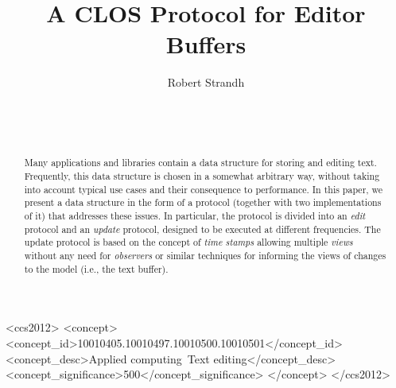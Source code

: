 \documentclass{sig-alternate-05-2015}
\def\inputtex#1{}
\begin{document}
\title{A CLOS Protocol for Editor Buffers}
\author{\alignauthor
Robert Strandh\\
\\
\\
\\
}


\maketitle

\begin{abstract}
Many applications and libraries contain a data structure for storing
and editing text.  Frequently, this data structure is chosen in a
somewhat arbitrary way, without taking into account typical use cases
and their consequence to performance.  In this paper, we present a
data structure in the form of a \clos{} protocol (together with two
implementations of it) that addresses these issues.  In particular,
the protocol is divided into an \emph{edit} protocol and an
\emph{update} protocol, designed to be executed at different
frequencies.  The update protocol is based on the concept of
\emph{time stamps} allowing multiple \emph{views} without any need for
\emph{observers} or similar techniques for informing the views of
changes to the model (i.e., the text buffer).
\end{abstract}

\begin{CCSXML}
  <ccs2012>
  <concept>
  <concept_id>10010405.10010497.10010500.10010501</concept_id>
  <concept_desc>Applied computing~Text editing</concept_desc>
  <concept_significance>500</concept_significance>
  </concept>
  </ccs2012>
\end{CCSXML}


\printccsdesc


\inputtex{spec-macros.tex}

\inputtex{sec-introduction.tex}
\inputtex{sec-previous.tex}
\inputtex{sec-our-method.tex}
\inputtex{sec-benefits.tex}
\inputtex{sec-conclusions.tex}
\inputtex{sec-acknowledgments.tex}
\inputtex{app-protocol.tex}



\end{document}
